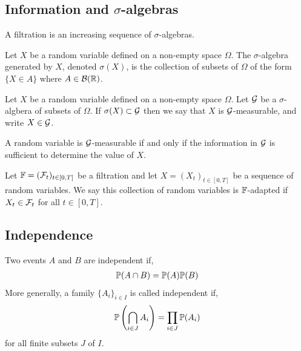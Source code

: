\documentclass[12pt]{article}
\begin{document}
\subsection{Information and \( \sigma \)-algebras}

\begin{definition}[Filtration]
A filtration is an increasing sequence of \( \sigma \)-algebras.
\end{definition}

\begin{definition}
Let \( X \) be a random variable defined on a non-empty space \( \Omega \). The \( \sigma \)-algebra generated by \( X \), denoted \( \sigma(X) \), is the collection of subsets of \( \Omega \) of the form \( \{X\in A\} \) where \( A\in\mathcal{B}(\mathbb{R}) \).
\end{definition}

\begin{definition}[\(\cG \)-measurable]
Let \( X \) be a random variable defined on a non-empty space \( \Omega \). Let \( \cG \) be a \( \sigma \)-algbera of subsets of \( \Omega \). If \( \sigma(X) \subset \mathcal{G} \) then  we say that \( X \) is \( \cG \)-measurable, and write \( X\in \mathcal{G} \).
\end{definition}

A random variable is \( \cG \)-measurable if and only if the information in \( \cG \) is sufficient to determine the value of \( X \).

\begin{definition}[\( \bF \)-adapted]
Let \( \mathbb{F} = (\mathcal{F}_t)_{t\in[0,T]} \) be a filtration and let \( X = (X_t)_{t\in[0,T]} \) be a sequence of random variables. We say this collection of random variables is \( \bF \)-adapted if \( X_t \in \mathcal{F}_t \) for all \( t\in[0,T] \).
\end{definition}

\subsection{Independence}
\begin{definition}
Two events \( A \) and \( B \) are independent if,
\begin{align*}
    \mathbb{P}(A\cap B) = \mathbb{P}(A)\mathbb{P}(B)
\end{align*}
More generally, a family \( \{A_i\}_{i\in I} \) is called independent if,
\begin{align*}
    \mathbb{P} \left( \bigcap_{i\in J}A_i \right) = \prod_{i\in J} \mathbb{P}(A_i)
\end{align*}
for all finite subsets \( J \) of \( I \).
\end{definition}
\end{document}
